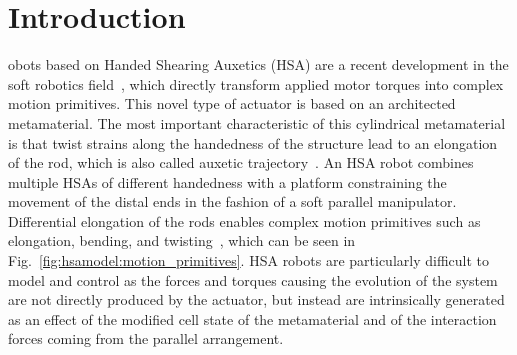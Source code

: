 \section{Introduction}\label{sec:hsamodel:introduction}


obots based on Handed Shearing Auxetics (HSA) are a recent development in the soft robotics field~\cite{chin2018compliant, truby2021recipe, zhang2022vision, lipton2018handedness, chin2019automated}, which directly transform applied motor torques into complex motion primitives.
%
This novel type of actuator is based on an architected metamaterial. The most important characteristic of this cylindrical metamaterial is that twist strains along the handedness of the structure lead to an elongation of the rod, which is also called auxetic trajectory~\cite{good2022expanding}. 
An \gls{HSA} robot combines multiple \glspl{HSA} of different handedness with a platform constraining the movement of the distal ends in the fashion of a soft parallel manipulator. 
Differential elongation of the rods enables complex motion primitives such as elongation, bending, and twisting~\cite{chin2018compliant}, which can be seen in Fig.~\ref{fig:hsamodel:motion_primitives}. %
\gls{HSA} robots are particularly difficult to model and control as the forces and torques causing the evolution of the system are not directly produced by the actuator, but instead are intrinsically generated as an effect of the modified cell state of the metamaterial and of the interaction forces coming from the parallel arrangement.


